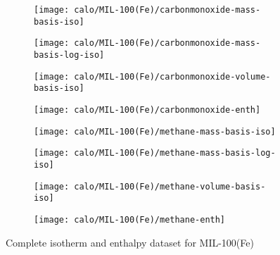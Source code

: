 \begin{figure}[H]
    \begin{subfigure}{0.25\textwidth}
        \texttt{[image: calo/MIL-100(Fe)/carbonmonoxide-mass-basis-iso]}%
        \label{appx:fig:shaping:mil100comass}
    \end{subfigure}%
    \begin{subfigure}{0.25\textwidth}
        \texttt{[image: calo/MIL-100(Fe)/carbonmonoxide-mass-basis-log-iso]}%
        \label{appx:fig:shaping:mil100comasslog}
    \end{subfigure}%
    \begin{subfigure}{0.25\textwidth}
        \texttt{[image: calo/MIL-100(Fe)/carbonmonoxide-volume-basis-iso]}%
        \label{appx:fig:shaping:mil100covolume}
    \end{subfigure}%
    \begin{subfigure}{0.25\textwidth}
        \texttt{[image: calo/MIL-100(Fe)/carbonmonoxide-enth]}%
        \label{appx:fig:shaping:mil100coenth}
    \end{subfigure}%


    \begin{subfigure}{0.25\textwidth}
        \texttt{[image: calo/MIL-100(Fe)/methane-mass-basis-iso]}%
        \label{appx:fig:shaping:mil100ch4mass}
    \end{subfigure}%
    \begin{subfigure}{0.25\textwidth}
        \texttt{[image: calo/MIL-100(Fe)/methane-mass-basis-log-iso]}%
        \label{appx:fig:shaping:mil100ch4masslog}
    \end{subfigure}%
    \begin{subfigure}{0.25\textwidth}
        \texttt{[image: calo/MIL-100(Fe)/methane-volume-basis-iso]}%
        \label{appx:fig:shaping:mil100ch4volume}
    \end{subfigure}%
    \begin{subfigure}{0.25\textwidth}
        \texttt{[image: calo/MIL-100(Fe)/methane-enth]}%
        \label{appx:fig:shaping:mil100ch4enth}
    \end{subfigure}%

    \caption{Complete isotherm and enthalpy dataset for MIL-100(Fe)}
    
\end{figure}

